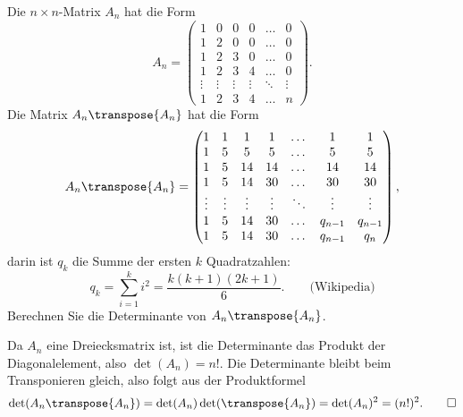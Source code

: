 Die $n\times n$-Matrix $A_n$ hat die Form
\[
A_n=\begin{pmatrix}
     1&     0&     0&     0&\dots &     0\\
     1&     2&     0&     0&\dots &     0\\
     1&     2&     3&     0&\dots &     0\\
     1&     2&     3&     4&\dots &     0\\
\vdots&\vdots&\vdots&\vdots&\ddots&\vdots\\
     1&     2&     3&     4&\dots &     n
\end{pmatrix}.
\]
Die Matrix $A_n\transpose{A_n}$ hat die Form
\[
A_n\transpose{A_n}
=
\begin{pmatrix}
     1&     1&     1&     1& \dots&      1&      1\\
     1&     5&     5&     5& \dots&      5&      5\\
     1&     5&    14&    14& \dots&     14&     14\\
     1&     5&    14&    30& \dots&     30&     30\\
\vdots&\vdots&\vdots&\vdots&\ddots& \vdots& \vdots\\
     1&     5&    14&    30& \dots&q_{n-1}&q_{n-1}\\
     1&     5&    14&    30& \dots&q_{n-1}&    q_n
\end{pmatrix},
\]
darin ist $q_k$ die Summe der ersten $k$ Quadratzahlen:
\[
q_k=\sum_{i=1}^ki^2=\frac{k(k+1)(2k+1)}6.
\qquad
\text{(Wikipedia)}
\]
Berechnen Sie die Determinante von $A_n\transpose{A_n}$.


\begin{loesung}
Da $A_n$ eine Dreiecksmatrix ist, ist die Determinante das Produkt der
Diagonalelement, also $\det(A_n)=n!$. 
Die Determinante bleibt beim Transponieren gleich, also folgt aus der
Produktformel
\[
\det(A_n\transpose{A_n})=\det(A_n)\det(\transpose{A_n})=\det(A_n)^2=(n!)^2.
\qedhere
\]
\end{loesung}


